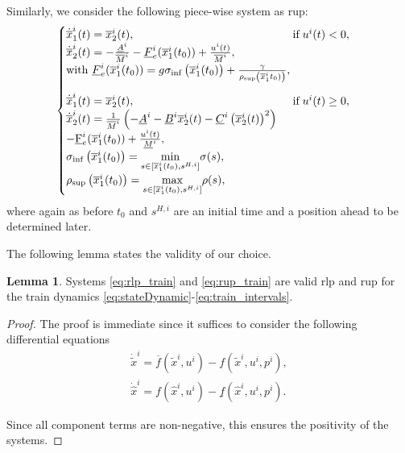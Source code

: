 \documentclass[letterpaper, 10 pt, conference]{ieeeconf}
\theoremstyle{definition}
\theoremstyle{nopoint}
\newtheorem{lemma}[theorem]{Lemma}
\begin{document}
Similarly, we consider the following piece-wise system as \gls{rup}:
\begin{equation}\label{eq:rup_train}
	\begin{cases}
		\dot{\overline{x}}_1^i(t) =   \overline{x}_2^i(t), \qquad  \qquad \qquad \qquad \qquad \qquad  \qquad  \text{if} \; u^i(t) < 0,  \\
		\dot{\overline{x}}_2^i(t) =  -\frac{\underline{A}^i}{\overline{M}^i}-\underline{F}_e^i(\overline{x}^i_1(t_0)) + \frac{u^i(t)}{\overline{M}^i}, \\
		\textrm{with } \underline{F}_e^i(\overline{x}^i_1(t_0)) =  g \sigma_{\inf}\left(\overline{x}^i_1(t_0)\right)+ \frac{\gamma}{\rho_{\sup}\left(\overline{x}^i_1t_0)\right)}, \\
		\noalign{\vskip9pt}
		\dot{\overline{x}}_1^i(t) =   \overline{x}_2^i(t), \qquad \qquad \qquad  \qquad \qquad \qquad \qquad \text{if} \; u^i(t) \geq 0,  \\
		\dot{\overline{x}}_2^i(t) =  \frac{1}{\overline{M}^i} \left(-\underline{A}^i - \underline{B}^i \overline{x}^i_2(t) -  \underline{C}^i \left(\overline{x}^i_2(t)\right)^2 \right) \\
		-  \underline{\mathrm{F}}_e^i(\overline{x}^i_1(t_0))  + \frac{u^i(t)}{\underline{M}^i}, \\
		\sigma_{\inf}\left(\overline{x}^i_1(t_0)\right) = \underset{s \in [\overline{x}_1^i(t_0),s^{H,i}]}{\min} \sigma(s), \\
		\rho_{\sup}\left(\overline{x}^i_1(t_0)\right) = \underset{s \in [\overline{x}_1^i(t_0),s^{H,i}]}{\max} \rho(s),
	\end{cases}
\end{equation}
where again as before $t_0$ and $s^{H,i}$ are an initial time and a position ahead to be determined later.   


 
  
The following lemma states the validity of our choice. 
  
\begin{lemma} \label{lemma:Proxies}
Systems \eqref{eq:rlp_train} and \eqref{eq:rup_train} are valid \gls{rlp} and \gls{rup} for the train dynamics \eqref{eq:stateDynamic}\--\eqref{eq:train_intervals}. 
  \begin{proof}
The proof is immediate since it suffices to consider the 
following differential equations
\begin{align*}
	\dot{\tilde{x}}^i = \overline{f}\left(\tilde{x}^i, u^i \right) - f\left(\tilde{x}^i, u^i, p^i \right), \\
	\dot{\hat{x}}^i = f\left(\hat{x}^i, u^i \right) - \underline{f}\left(\hat{x}^i, u^i, p^i \right).
\end{align*}

Since all component terms are non-negative, this ensures the positivity of the systems.

  \end{proof}
\end{lemma}
\end{document}
